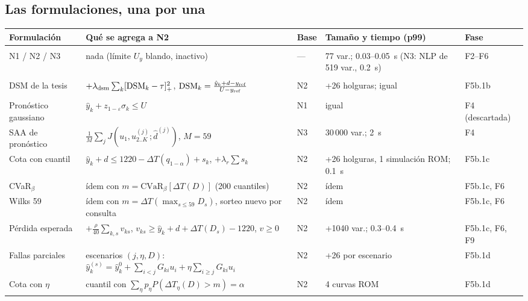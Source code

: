 \subsection{Las formulaciones, una por una}
\begin{table}[H]\centering\scriptsize\setlength{\tabcolsep}{2.5pt}
\begin{tabularx}{\linewidth}{@{}>{\raggedright\arraybackslash}p{24mm} >{\raggedright\arraybackslash}p{50mm} >{\raggedright\arraybackslash}p{16mm} Y >{\raggedright\arraybackslash}p{14mm}@{}}\toprule
Formulación & Qué se agrega a N2 & Base & Tamaño y tiempo (p99) & Fase\\\midrule
{}\\
N1 / N2 / N3 & nada (límite $U_y$ blando, inactivo) & --- & 77 var.; 0.03--0.05~s (N3: NLP de 519 var., 0.2~s) & F2--F6\\
\\
DSM de la tesis & $+\lambda_{\rm dsm}\sum_k[\mathrm{DSM}_k-\tau]_+^2$, $\mathrm{DSM}_k=\frac{\hat y_k+d-y_{\rm ref}}{U-y_{\rm ref}}$ & N2 & +26 holguras; igual & F5b.1b\\
\\
Pronóstico gaussiano & $\hat y_k+z_{1-\varepsilon}\sigma_k\le U$ & N1 & igual & F4 (descartada)\\
SAA de pronóstico & $\frac1M\sum_jJ(u_1,u^{(j)}_{2..K};\hat d^{(j)})$, $M=59$ & N3 & 30\,000 var.; 2~s & F4\\
Cota con cuantil & $\hat y_k+d\le1220-\Delta T(q_{1-\alpha})+s_k$, $+\lambda_r\sum s_k$ & N2 & +26 holguras, 1 simulación ROM; 0.1~s & F5b.1c\\
CVaR$_\beta$ & ídem con $m=\mathrm{CVaR}_\beta[\Delta T(D)]$ (200 cuantiles) & N2 & ídem & F5b.1c, F6\\
Wilks 59 & ídem con $m=\Delta T(\max_{s\le59}D_s)$, sorteo nuevo por consulta & N2 & ídem & F5b.1c, F6\\
Pérdida esperada & $+\frac{\rho}{40}\sum_{k,s}v_{ks}$, $v_{ks}\ge\hat y_k+d+\Delta T(D_s)-1220$, $v\ge0$ & N2 & +1040 var.; 0.3--0.4~s & F5b.1c, F6, F9\\
Fallas parciales & escenarios $(j,\eta,D)$: $\hat y^{(s)}_k=\hat y^0_k+\sum_{i<j}G_{ki}u_i+\eta\sum_{i\ge j}G_{ki}u_i$ & N2 & +26 por escenario & F5b.1d\\
Cota con $\eta$ & cuantil con $\sum_\eta p_\eta P(\Delta T_\eta(D)>m)=\alpha$ & N2 & 4 curvas ROM & F5b.1d\\

\end{tabularx}
\end{table}
